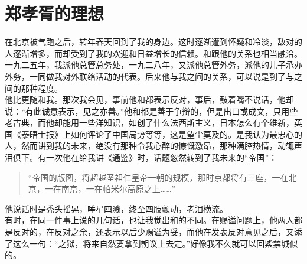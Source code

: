 \fancyhead[RO]{\thepage} %
\fancyhead[LE]{\thepage} %
\chapter*{郑孝胥的理想}
在北京被气跑之后，转年春天回到了我的身边。这时逐渐遭到怀疑和冷淡，敌对的人逐渐增多，而却受到了我的欢迎和日益增长的信赖。和跟他的关系也相当融洽。一九二五年，我派他总管总务处，一九二八年，又派他总管外务，派他的儿子承办外务，一同做我对外联络活动的代表。后来他与我之间的关系，可以说是到了与之间的那种程度。\\

他比更随和我。那次我会见，事前他和都表示反对，事后，鼓着嘴不说话，他却说：“有此诚意表示，见之亦善。”他和都是善于争辩的，但是出口或成文，只用些老古典，而他却能用一些洋知识，如创了什么法西斯主义，日本怎么有个维新，英国《泰晤士报》上如何评论了中国局势等等，这是望尘莫及的。是我认为最忠心的人，然而讲到我的未来，绝没有那种令我心醉的慷慨激昂，那种满腔热情，动辄声泪俱下。有一次他在给我讲《通鉴》时，话题忽然转到了我未来的“帝国”：\\

\begin{quote}
	“帝国的版图，将超越圣祖仁皇帝一朝的规模，那时京都将有三座，一在北京，一在南京，一在帕米尔高原之上……”\\
\end{quote}

他说话时是秃头摇晃，唾星四溅，终至四肢颤动，老泪横流。\\

有时，在同一件事上说的几句话，也让我觉出和的不同。在赐谥问题上，他两人都是反对的，在反对之余，还表示以后少赐谥为妥，而他在发表反对意见之后，又添了这么一句：“之狱，将来自然要拿到朝议上去定。”好像我不久就可以回紫禁城似的。\\


